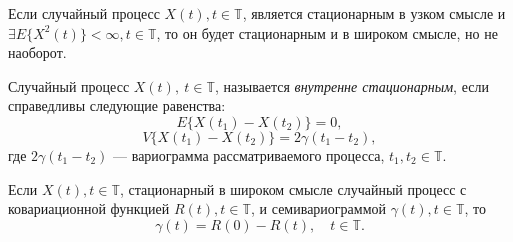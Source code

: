\begin{Remark}
	Если случайный процесс $ X(t), t \in \mathbb{T} $, является стационарным в узком смысле и $ \exists E \{ X^2(t) \} < \infty, t \in \mathbb{T} $, то он будет стационарным и в широком смысле, но не наоборот.
\end{Remark}

\begin{Definition}
\label{eq:innerstat}
	Случайный процесс $ X(t),~ t \in \mathbb{T} $, называется \textit{внутренне стационарным}, если справедливы следующие равенства:
	\begin{equation}
	\label{eq:instat_expected}
		E \{ X(t_1) - X(t_2) \} = 0,
	\end{equation}
	\begin{equation}
	\label{eq:instat_var}
	  V \{ X(t_1) - X(t_2) \} = 2 \gamma (t_1 - t_2),
	\end{equation}
	где $ 2 \gamma(t_1 - t_2) $ --- вариограмма рассматриваемого процесса, $ t_1, t_2 \in \mathbb{T} $.
\end{Definition}

\begin{Remark}
	Если $ X(t), t \in \mathbb{T} $, стационарный в широком смысле случайный процесс с ковариационной функцией $ R(t), t \in \mathbb{T} $, и семивариограммой $ \gamma(t), t \in \mathbb{T} $, то
	\begin{equation*}
		\gamma(t) = R(0) - R(t), \quad t \in \mathbb{T}.
	\end{equation*}
\end{Remark}

